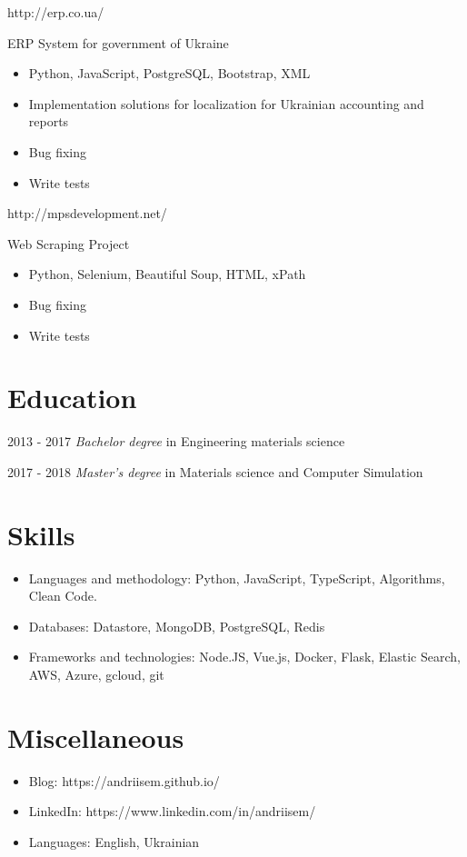 \documentclass{resume}
\begin{document}
http://erp.co.ua/

ERP System for government of Ukraine 
\begin{itemize}
  \item Python, JavaScript, PostgreSQL, Bootstrap, XML
  \item Implementation solutions for localization for Ukrainian accounting and reports
  \item Bug fixing
  \item Write tests
\end{itemize}


http://mpsdevelopment.net/

Web Scraping Project
\begin{itemize}
  \item Python, Selenium, Beautiful Soup, HTML, xPath
  \item Bug fixing
  \item Write tests
\end{itemize}

\section{Education}
 {2013 - 2017}
\textit{Bachelor degree} in Engineering materials science 

 {2017 - 2018}
\textit{Master's degree} in Materials science and Computer Simulation

\section{Skills}
\begin{itemize}[parsep=0.5ex]
    \item Languages and methodology: Python, JavaScript, TypeScript, Algorithms, Clean Code.
    \item Databases: Datastore, MongoDB, PostgreSQL, Redis
    \item Frameworks and technologies: Node.JS, Vue.js, Docker, Flask, Elastic Search, AWS, Azure, gcloud, git
\end{itemize}

\section{Miscellaneous}
\begin{itemize}[parsep=0.5ex]
  \item Blog: https://andriisem.github.io/
  \item LinkedIn: https://www.linkedin.com/in/andriisem/
  \item Languages: English, Ukrainian
\end{itemize}
\end{document}
